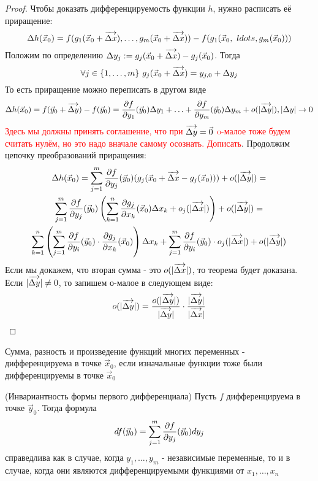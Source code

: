\begin{proof}
	Чтобы доказать дифференцируемость функции $h$, нужно расписать её приращение:
	\[
		\Delta h(\vec{x}_0) = f(g_1(\vec{x}_0 + \overrightarrow{\Delta x}), \ldots, g_m(\vec{x}_0 + \overrightarrow{\Delta x})) - f(g_1(\vec{x}_0,\ ldots, g_m(\vec{x}_0)))
	\]
	Положим по определению $\Delta y_j := g_j(\vec{x}_0 + \overrightarrow{\Delta x}) - g_j(\vec{x}_0)$. Тогда
	\[
		\forall j \in \{1, \ldots, m\}\ g_j(\vec{x}_0 + \overrightarrow{\Delta x}) = y_{j, 0} + \Delta y_j
	\]
	То есть приращение можно переписать в другом виде
	\[
		\Delta h(\vec{x}_0) = f(\vec{y}_0 + \overrightarrow{\Delta y}) - f(\vec{y}_0) = \frac{\partial f}{\partial y_1} (\vec{y}_0) \Delta y_1 + \ldots + \frac{\partial f}{\partial y_m} (\vec{y}_0) \Delta y_m + o(|\overrightarrow{\Delta y}|), |\Delta y| \to 0
	\]
	\textcolor{red}{Здесь мы должны принять соглашение, что при $\overrightarrow{\Delta y} = \vec{0}$ o-малое тоже будем считать нулём, но это надо вначале самому осознать. Дописать}. Продолжим цепочку преобразований приращения:
	\begin{multline*}
		\Delta h(\vec{x}_0) = \sum\limits_{j = 1}^m \frac{\partial f}{\partial y_j} (\vec{y}_0) (g_j(\vec{x}_0 + \overrightarrow{\Delta x} - g_j(\vec{x}_0))) + o(|\overrightarrow{\Delta y}|) =
		\\
		\sum\limits_{j = 1}^m \frac{\partial f}{\partial y_j} (\vec{y}_0) \left(\sum\limits_{k = 1}^n \frac{\partial g_j}{\partial x_k} (\vec{x}_0) \Delta x_k + o_j(|\overrightarrow{\Delta x}|)\right) + o(|\overrightarrow{\Delta y}|) =
		\\
		\sum\limits_{k = 1}^n \left(\sum\limits_{j = 1}^m \frac{\partial f}{\partial y_i} (\vec{y}_0) \cdot \frac{\partial g_j}{\partial x_k} (\vec{x}_0)\right) \Delta x_k + \sum\limits_{j = 1}^m \frac{\partial f}{\partial y_i} (\vec{y}_0) \cdot o_j(|\overrightarrow{\Delta x}|) + o(|\overrightarrow{\Delta y}|)
	\end{multline*}
	Если мы докажем, что вторая сумма - это $o(|\overrightarrow{\Delta x}|)$, то теорема будет доказана. Если $|\overrightarrow{\Delta y}| \neq 0$, то запишем о-малое в следующем виде:
	\[
		o(|\overrightarrow{\Delta y}|) = \frac{o(|\overrightarrow{\Delta y}|)}{|\overrightarrow{\Delta y}|} \cdot \frac{|\overrightarrow{\Delta y}|}{|\overrightarrow{\Delta x}|}
	\]
\end{proof}

\begin{corollary}
	Сумма, разность и произведение функций многих переменных - дифференцируема в точке $\vec{x}_0$, если изначальные функции тоже были дифференцируемы в точке $\vec{x}_0$
\end{corollary}

\begin{corollary} (Инвариантность формы первого дифференциала)
	Пусть $f$ дифференцируема в точке $\vec{y}_0$. Тогда формула
	\[
		df(\vec{y}_0) = \sum\limits_{j = 1}^m \frac{\partial f}{\partial y_j} (\vec{y}_0) dy_j
	\]
	справедлива как в случае, когда $y_1, \ldots, y_m$ - независимые переменные, то и в случае, когда они являются дифференцируемыми функциями от $x_1, \ldots, x_n$
\end{corollary}

